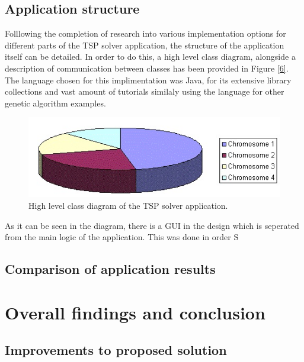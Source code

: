 \documentclass[article]{IEEEtran}
\begin{document}
\subsection{Application structure}
Folllowing the completion of research into various implementation options for different parts of the TSP solver application, the structure of the application itself can be detailed. In order to do this, a high level class diagram, alongside a description of communication between classes has been provided in Figure \ref{6}. The language chosen for this implimentation was Java, for its extensive library collections and vast amount of tutorials similaly using the language for other genetic algorithm examples.
\begin{figure}[H]
\centering
  \includegraphics[width=.8\linewidth]{images/rank}
  \caption{High level class diagram of the TSP solver application.}
  \label{fig:6}
\end{figure}
As it can be seen in the diagram, there is a GUI in the design which is seperated from the main logic of the application. This was done in order S

\subsection{Comparison of application results}

\section{Overall findings and conclusion}

\subsection{Improvements to proposed solution}
\end{document}
